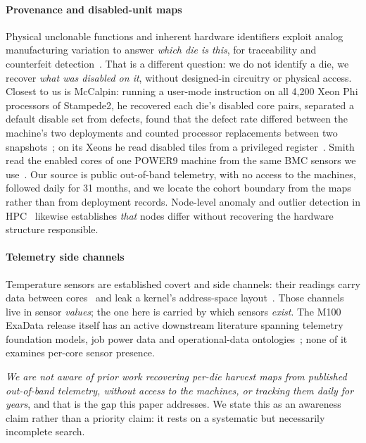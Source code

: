 \documentclass[10pt,conference]{IEEEtran}
\begin{document}
\paragraph*{Provenance and disabled-unit maps} Physical unclonable functions and inherent
hardware identifiers exploit analog manufacturing variation to answer \emph{which die is this},
for traceability and counterfeit detection~\cite{jetta2025provenance}. That is a different
question: we do not identify a die, we recover \emph{what was disabled on it}, without
designed-in circuitry or physical access. Closest to us is McCalpin: running a user-mode
instruction on all 4{,}200 Xeon Phi processors of Stampede2, he recovered each die's disabled core
pairs, separated a default disable set from defects, found that the defect rate differed between
the machine's two deployments and counted processor replacements between two
snapshots~\cite{mccalpin2021knl}; on its Xeons he read disabled tiles from a privileged
register~\cite{mccalpin2021capid}. Smith read the enabled cores of one POWER9 machine from the same
BMC sensors we use~\cite{smith2020p9layout}. Our source is public out-of-band telemetry, with no
access to the machines, followed daily for 31 months, and we locate the cohort boundary from the
maps rather than from deployment records. Node-level anomaly and outlier detection in
HPC~\cite{nodesentry2025,badnodes2020} likewise establishes \emph{that} nodes differ without
recovering the hardware structure responsible.

\paragraph*{Telemetry side channels} Temperature sensors are established covert and side
channels: their readings carry data between cores~\cite{masti2015thermal} and leak a kernel's
address-space layout~\cite{kim2022thermalbleed}. Those channels live in sensor \emph{values}; the
one here is carried by which sensors \emph{exist}. The M100 ExaData release itself has an active
downstream literature spanning telemetry foundation models, job power data and operational-data
ontologies~\cite{m100_setdiff,antici2023pm100,m100_ontology}; none of it examines per-core sensor
presence.

\emph{We are not aware of prior work recovering per-die harvest maps from published out-of-band
telemetry, without access to the machines, or tracking them daily for years}, and that is the gap
this paper addresses. We state this as an awareness claim rather
than a priority claim: it rests on a systematic but necessarily incomplete search.
\end{document}
